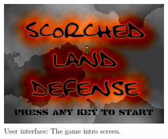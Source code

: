 \begin{figure}[ht]
\centering
\includegraphics[scale=0.6]{screenshots/16665.png}
\caption{User interface: The game intro screen.}
\label{fig:gamescr0}
\end{figure}
